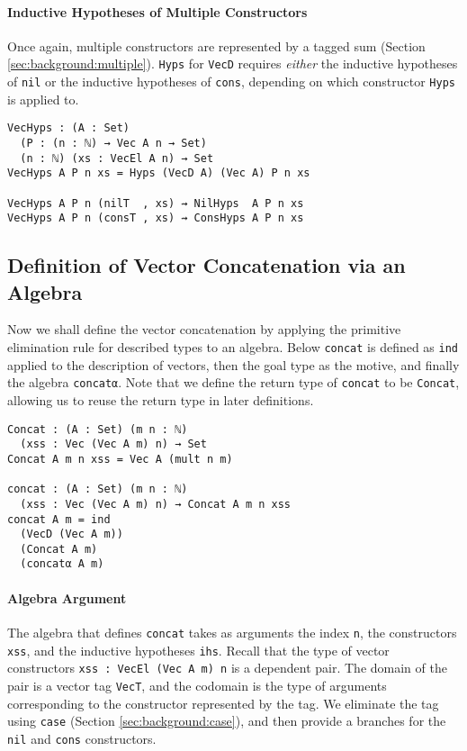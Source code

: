 \documentclass[preprint,nonatbib]{sigplanconf}
\newcommand{\refsec}[1]{Section \ref{sec:#1}}
\begin{document}
\paragraph{Inductive Hypotheses of Multiple Constructors}

Once again, multiple constructors are represented by a tagged
sum (\refsec{background:multiple}). {\tt Hyps} for
{\tt VecD} requires {\it either} the inductive hypotheses of
{\tt nil} or the inductive hypotheses of {\tt cons}, depending on
which constructor {\tt Hyps} is applied to.

\begin{verbatim}
VecHyps : (A : Set)
  (P : (n : ℕ) → Vec A n → Set)
  (n : ℕ) (xs : VecEl A n) → Set
VecHyps A P n xs = Hyps (VecD A) (Vec A) P n xs

VecHyps A P n (nilT  , xs) ⇝ NilHyps  A P n xs 
VecHyps A P n (consT , xs) ⇝ ConsHyps A P n xs 
\end{verbatim}

\subsection{Definition of Vector Concatenation via an Algebra}

Now we shall define the vector concatenation by applying the primitive
elimination rule for described types to an algebra. Below
{\tt concat} is defined as {\tt ind} applied to the description of
vectors, then the goal type as the motive, and finally the algebra
{\tt concatα}.
Note that we define the return type of
{\tt concat} to be {\tt Concat}, allowing us to reuse the return type
in later definitions.

\begin{verbatim}
Concat : (A : Set) (m n : ℕ)
  (xss : Vec (Vec A m) n) → Set
Concat A m n xss = Vec A (mult n m)

concat : (A : Set) (m n : ℕ)
  (xss : Vec (Vec A m) n) → Concat A m n xss
concat A m = ind
  (VecD (Vec A m))
  (Concat A m)
  (concatα A m)
\end{verbatim}

\paragraph{Algebra Argument}

The algebra that defines {\tt concat} takes as arguments the index
{\tt n}, the constructors {\tt xss}, and the inductive hypotheses
{\tt ihs}. Recall that the type of vector constructors
{\tt xss : VecEl (Vec A m) n} is a dependent pair. The domain of the
pair is a vector tag {\tt VecT}, and the codomain is the type of
arguments corresponding to the constructor represented by the tag. We
eliminate the tag using {\tt case} (\refsec{background:case}), and
then provide a branches for the {\tt nil} and {\tt cons} constructors.
\end{document}
